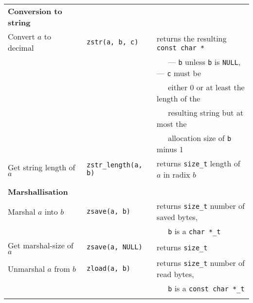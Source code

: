 \documentclass[10pt,draft]{article}
\begin{document}
\begin{tabular}{lll}
\textbf{Conversion to string} & {}                         & {}                                                \\
Convert $a$ to decimal        & {\tt zstr(a, b, c)}        & returns the resulting {\tt const char *}          \\
{}                            & {}                         & $~~~~~$ --- {\tt b} unless {\tt b} is {\tt NULL},
                                                                     --- {\tt c} must be                       \\
{}                            & {}                         & $~~~~~$ either 0 or at least the length of the    \\
{}                            & {}                         & $~~~~~$ resulting string but at most the          \\
{}                            & {}                         & $~~~~~$ allocation size of {\tt b} minus 1        \\
Get string length of $a$      & {\tt zstr\_length(a, b)}   & returns {\tt size\_t} length of $a$ in radix $b$  \\
\\

\textbf{Marshallisation}      & {}                         & {}                                                \\
Marshal $a$ into $b$          & {\tt zsave(a, b)}          & returns {\tt size\_t} number of saved bytes,      \\
{}                            & {}                         & $~~~~~$ {\tt b} is a {\tt char *\_t}              \\
Get marshal-size of $a$       & {\tt zsave(a, NULL)}       & returns {\tt size\_t}                             \\
Unmarshal $a$ from $b$        & {\tt zload(a, b)}          & returns {\tt size\_t} number of read bytes,       \\
{}                            & {}                         & $~~~~~$ {\tt b} is a {\tt const char *\_t}        \\
\\


\end{tabular}
\end{document}
